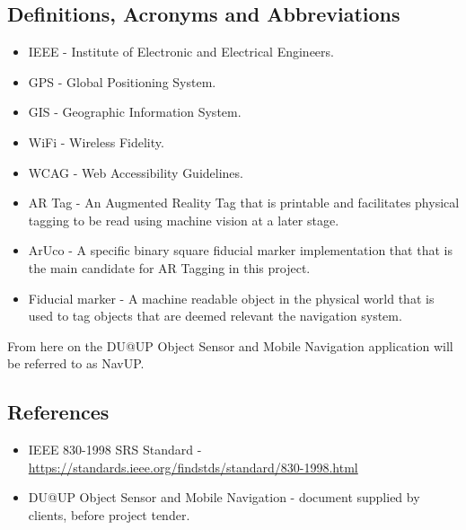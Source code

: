 		
	\subsection{Definitions, Acronyms and Abbreviations}
		\begin{itemize}
			\item IEEE - Institute of Electronic and Electrical Engineers.
			\item GPS - Global Positioning System.
			\item GIS - Geographic Information System.
			\item WiFi - Wireless Fidelity.
			\item WCAG - Web Accessibility Guidelines.
			\item AR Tag - An Augmented Reality Tag that is printable and facilitates physical tagging to be read using machine vision at a later stage.
			\item ArUco - A specific binary square fiducial marker implementation that that is the main candidate for AR Tagging in this project.
			\item Fiducial marker - A machine readable object in the physical world that is used to tag objects that are deemed relevant the navigation system.
		\end{itemize}
		
		From here on the DU@UP Object Sensor and Mobile Navigation application will be referred to as NavUP.
		
	\subsection{References}
		\begin{itemize}
			\item IEEE 830-1998 SRS Standard - \url{https://standards.ieee.org/findstds/standard/830-1998.html}
			\item DU@UP Object Sensor and Mobile Navigation - document supplied by clients, before project tender.
		\end{itemize}
	
\newpage
%
%	

